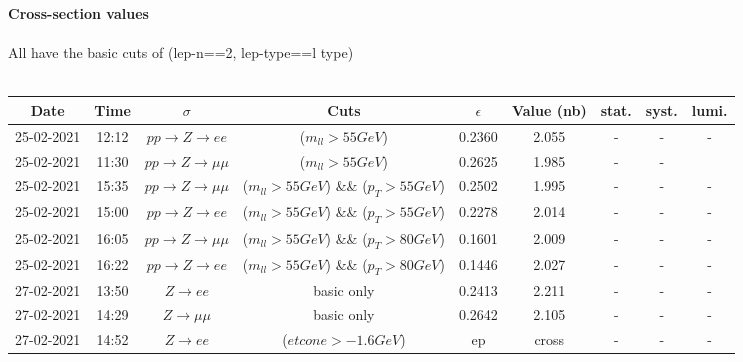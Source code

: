 
\textbf{Cross-section values}
\\\\
All have the basic cuts of (lep-n==2, lep-type=={l type})\\\\
\begin{tabular}{ | c | c | c | c | c | c | c | c | c |}
  \hline		
  Date & Time & $\sigma$ & Cuts & $\epsilon$ & Value (nb) & stat. & syst. & lumi. \\
  \hline
  25-02-2021 & 12:12 & $pp \rightarrow Z \rightarrow ee$ & ($m_{ll} > 55 GeV$) & 0.2360  & 2.055 & - & - & -   \\
  
  25-02-2021 & 11:30 & $pp \rightarrow Z \rightarrow \mu\mu$ & ($m_{ll} > 55 GeV$) & 0.2625 & 1.985 & - & -\\
  
  25-02-2021 & 15:35 & $pp \rightarrow Z \rightarrow \mu\mu$ & ($m_{ll} > 55 GeV$) \&\& ($p_T > 55 GeV$) & 0.2502 & 1.995 & - & - & - \\
  
  25-02-2021 & 15:00 & $pp \rightarrow Z \rightarrow ee$ & ($m_{ll} > 55 GeV$) \&\& ($p_T > 55 GeV$) & 0.2278 & 2.014 & - & - & -  \\
  
  25-02-2021 & 16:05 & $pp \rightarrow Z \rightarrow \mu\mu$ & ($m_{ll} > 55 GeV$) \&\& ($p_T > 80 GeV$) & 0.1601 & 2.009 & - & - & - \\
  
  25-02-2021 & 16:22 & $pp \rightarrow Z \rightarrow ee$ & ($m_{ll} > 55 GeV$) \&\& ($p_T > 80 GeV$) & 0.1446 & 2.027 & - & - & - \\
  
  \hline  
  
  27-02-2021 & 13:50 & $Z \rightarrow ee$ & basic only & 0.2413 & 2.211 & - & - & -  \\
  


  27-02-2021 & 14:29 & $Z \rightarrow \mu\mu$ & basic only & 0.2642 & 2.105 & - & - & -  \\
  
  27-02-2021 & 14:52 & $Z \rightarrow ee$ & ($etcone > -1.6 GeV $) & ep & cross & - & - & -  \\
  
  \hline
\end{tabular}
